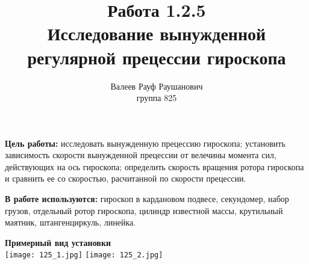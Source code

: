 \documentclass[a4paper, 12pt]{article}%
\author{Валеев Рауф Раушанович \\
группа 825}
\title{\textbf{Работа 1.2.5 \\
Исследование вынужденной регулярной прецессии гироскопа}}
\begin{document}
\maketitle
\newpage
\textbf{Цель работы:} исследовать вынужденную прецессию гироскопа; установить зависимость скорости вынужденной прецессии от велечины момента сил, действующих на ось гироскопа; определить скорость вращения ротора гироскопа и сравнить ее со скоростью, расчитанной по скорости прецессии.

\textbf{В работе используются:} гироскоп в кардановом подвесе, секундомер, набор грузов, отдельный ротор гироскопа, цилиндр известной массы, крутильный маятник, штангенциркуль, линейка. 

\textbf{Примерный вид установки}\\
\texttt{[image: 125\_1.jpg]}
\texttt{[image: 125\_2.jpg]}
\end{document}
